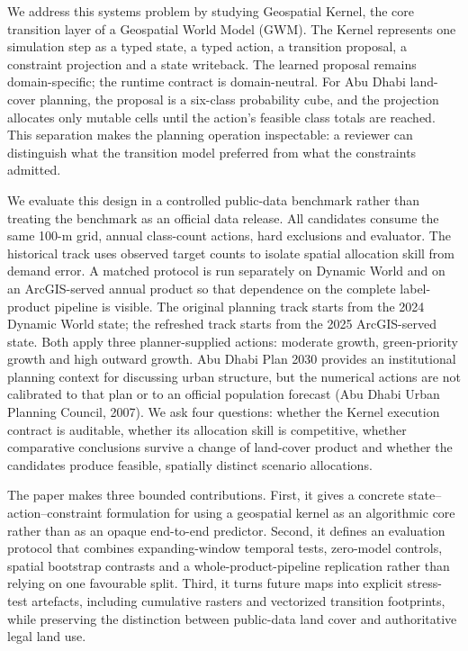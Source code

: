 We address this systems problem by studying Geospatial Kernel, the core
transition layer of a Geospatial World Model (GWM). The Kernel
represents one simulation step as a typed state, a typed action, a
transition proposal, a constraint projection and a state writeback. The
learned proposal remains domain-specific; the runtime contract is
domain-neutral. For Abu Dhabi land-cover planning, the proposal is a
six-class probability cube, and the projection allocates only mutable
cells until the action's feasible class totals are reached. This
separation makes the planning operation inspectable: a reviewer can
distinguish what the transition model preferred from what the
constraints admitted.

We evaluate this design in a controlled public-data benchmark rather
than treating the benchmark as an official data release. All candidates
consume the same 100-m grid, annual class-count actions, hard exclusions
and evaluator. The historical track uses observed target counts to
isolate spatial allocation skill from demand error. A matched protocol
is run separately on Dynamic World and on an ArcGIS-served annual
product so that dependence on the complete label-product pipeline is
visible. The original planning track starts from the 2024 Dynamic World
state; the refreshed track starts from the 2025 ArcGIS-served state.
Both apply three planner-supplied actions: moderate growth,
green-priority growth and high outward growth. Abu Dhabi Plan 2030
provides an institutional planning context for discussing urban
structure, but the numerical actions are not calibrated to that plan or
to an official population forecast (Abu Dhabi Urban Planning Council,
2007). We ask four questions: whether the Kernel execution contract is
auditable, whether its allocation skill is competitive, whether
comparative conclusions survive a change of land-cover product and
whether the candidates produce feasible, spatially distinct scenario
allocations.

The paper makes three bounded contributions. First, it gives a concrete
state--action--constraint formulation for using a geospatial kernel as
an algorithmic core rather than as an opaque end-to-end predictor.
Second, it defines an evaluation protocol that combines expanding-window
temporal tests, zero-model controls, spatial bootstrap contrasts and a
whole-product-pipeline replication rather than relying on one favourable
split. Third, it turns future maps into explicit stress-test artefacts,
including cumulative rasters and vectorized transition footprints, while
preserving the distinction between public-data land cover and
authoritative legal land use.

